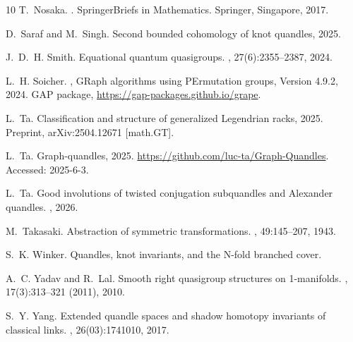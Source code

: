 \documentclass{jonasart}
\begin{document}
{\begin{thebibliography}{10}
        T.~Nosaka.
        .
        \newblock SpringerBriefs in Mathematics. Springer, Singapore, 2017.
        
        D.~Saraf and M.~Singh.
        \newblock Second bounded cohomology of knot quandles, 2025.
        
        J.~D.~H. Smith.
        \newblock Equational quantum quasigroups.
        , 27(6):2355–2387, 2024.
        
        L.~H. Soicher.
        , {GR}aph algorithms using {PE}rmutation groups, {V}ersion
        4.9.2, 2024.
        \newblock GAP package, \url{https://gap-packages.github.io/grape}.
        
        L.~Ta.
        \newblock Classification and structure of generalized Legendrian racks, 2025.
        \newblock Preprint, arXiv:2504.12671 [math.GT].
        
        L.~Ta.
        \newblock Graph-quandles, 2025.
        \newblock \url{https://github.com/luc-ta/Graph-Quandles}. Accessed: 2025-6-3.
        
        L.~Ta.
        \newblock Good involutions of twisted conjugation subquandles and Alexander
        quandles.
        , 2026.
        
        M.~Takasaki.
        \newblock Abstraction of symmetric transformations.
        , 49:145--207, 1943.
        
        S.~K. Winker.
        \newblock Quandles, knot invariants, and the {N}-fold branched cover.
        
        A.~C. Yadav and R.~Lal.
        \newblock Smooth right quasigroup structures on 1-manifolds.
        ,
        17(3):313--321 (2011), 2010.
        
        S.~Y. Yang.
        \newblock Extended quandle spaces and shadow homotopy invariants of classical
        links.
        , 26(03):1741010,
        2017.
    \end{thebibliography}
    }
\end{document}
